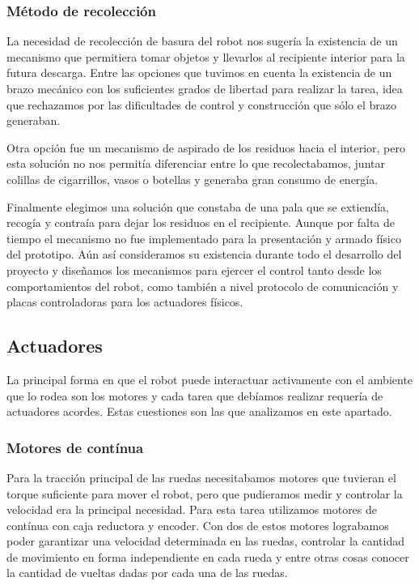 \subsubsection{M\'etodo de recolecci\'on}
\label{h_ideas_recoleccion}

La necesidad de recolecci\'on de basura del robot nos suger\'ia la existencia de un mecanismo que permitiera
tomar objetos y llevarlos al recipiente interior para la futura descarga.
Entre las opciones que tuvimos en cuenta la existencia de un brazo mec\'anico con los suficientes grados de
libertad para realizar la tarea, idea que rechazamos por las dificultades de control y construcci\'on que
s\'olo el brazo generaban.

Otra opci\'on fue un mecanismo de aspirado de los residuos hacia el interior, pero esta soluci\'on no nos
permit\'ia diferenciar entre lo que recolectabamos, juntar colillas de cigarrillos, vasos o botellas y
generaba gran consumo de energ\'ia.

Finalmente elegimos una soluci\'on que constaba de una pala que se extiend\'ia, recog\'ia y contra\'ia para
dejar los residuos en el recipiente.
Aunque por falta de tiempo el mecanismo no fue implementado para la presentaci\'on y armado f\'isico del prototipo.
A\'un as\'i consideramos su existencia durante todo el desarrollo del proyecto y dise\~namos los mecanismos
para ejercer el control tanto desde los comportamientos del robot, como tambi\'en a nivel protocolo de
comunicaci\'on y placas controladoras para los actuadores f\'isicos.

\subsection{Actuadores}
\label{h_actuadores}

La principal forma en que el robot puede interactuar activamente con el ambiente que lo rodea son los motores y
cada tarea que deb\'iamos realizar requer\'ia de actuadores acordes.
Estas cuestiones son las que analizamos en este apartado.

\subsubsection{Motores de cont\'inua}
\label{h_actuadores_motorDC}

Para la tracci\'on principal de las ruedas necesitabamos motores que tuvieran el torque suficiente
para mover el robot, pero que pudieramos medir y controlar la velocidad era la principal necesidad.
Para esta tarea utilizamos motores de cont\'inua con caja reductora y encoder.
Con dos de estos motores lograbamos poder garantizar una velocidad determinada en las ruedas, controlar
la cantidad de movimiento en forma independiente en cada rueda y entre otras cosas conocer la cantidad
de vueltas dadas por cada una de las ruedas.

